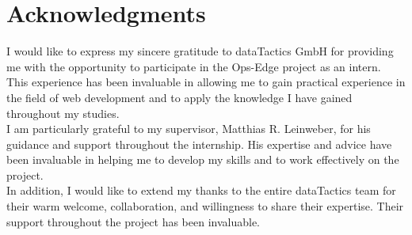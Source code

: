 
\begingroup
\let\clearpage\relax
\let\cleardoublepage\relax
\let\cleardoublepage\relax
\chapter*{Acknowledgments}
I would like to express my sincere gratitude to dataTactics GmbH for providing
me with the opportunity to participate in the Ops-Edge project as an intern.
This experience has been invaluable in allowing me to gain practical experience
in the field of web development and to apply the knowledge I have gained
throughout my studies.\\

I am particularly grateful to my supervisor, Matthias R. Leinweber, for his
guidance and support throughout the internship. His expertise and advice have
been invaluable in helping me to develop my skills and to work effectively on
the project.\\

In addition, I would like to extend my thanks to the entire dataTactics team
for their warm welcome, collaboration, and willingness to share their
expertise. Their support throughout the project has been invaluable.
\endgroup

